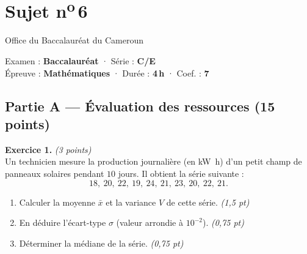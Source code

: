 \section{Sujet n\textsuperscript{o}\,6}
\noindent\begin{minipage}{0.5\linewidth}\footnotesize Office du Baccalauréat du Cameroun\end{minipage}%
\hfill\begin{minipage}{0.45\linewidth}\footnotesize\raggedleft Examen : \textbf{Baccalauréat} · Série : \textbf{C/E}\\
Épreuve : \textbf{Mathématiques} · Durée : \textbf{4\,h} · Coef. : \textbf{7}\end{minipage}
\par\smallskip{\color{onbo}\rule{\linewidth}{1pt}}

\subsection*{Partie A — Évaluation des ressources \hfill (15 points)}

\noindent\textbf{Exercice 1.} \hfill\textit{(3 points)}\\
Un technicien mesure la production journalière (en \si{\kilo\watt\hour}) d'un petit champ
de panneaux solaires pendant $10$ jours. Il obtient la série suivante :
\[ 18,\ 20,\ 22,\ 19,\ 24,\ 21,\ 23,\ 20,\ 22,\ 21. \]
\begin{enumerate}[label=\arabic*)]
\item Calculer la moyenne $\bar x$ et la variance $V$ de cette série. \hfill\textit{(1,5 pt)}
\item En déduire l'écart-type $\sigma$ (valeur arrondie à $10^{-2}$). \hfill\textit{(0,75 pt)}
\item Déterminer la médiane de la série. \hfill\textit{(0,75 pt)}
\end{enumerate}

